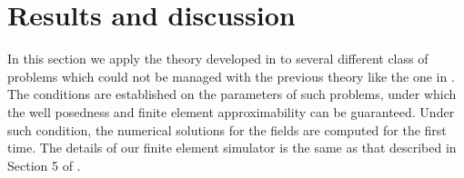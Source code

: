 \section{Results and discussion}  
In this section we apply the theory developed in \cite{kalarickel2020well} to 
several different class of problems which could not be managed with the 
previous theory like the one in \cite{bianisotropi_m3as}.
The conditions are established on the parameters of such problems, 
under which the well posedness and finite element 
approximability  can be guaranteed.
Under such condition, the numerical solutions for the fields are 
computed for the first time.
The details of our finite element simulator is the same as that 
described in Section 5 of \cite{kalarickel2020well}.




